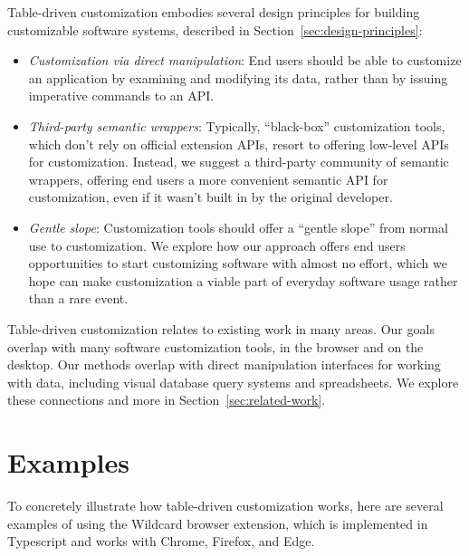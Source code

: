 \documentclass[sigplan,10pt,anonymous,review]{acmart}
\providecommand{\tightlist}{%
  \setlength{\itemsep}{0pt}\setlength{\parskip}{0pt}}
\begin{document}
Table-driven customization embodies several design principles for
building customizable software systems, described in
Section~\ref{sec:design-principles}:

\begin{itemize}
\tightlist
\item
  \emph{Customization via direct manipulation}: End users should be able
  to customize an application by examining and modifying its data,
  rather than by issuing imperative commands to an API.
\item
  \emph{Third-party semantic wrappers}: Typically, ``black-box''
  customization tools, which don't rely on official extension APIs,
  resort to offering low-level APIs for customization. Instead, we
  suggest a third-party community of semantic wrappers, offering end
  users a more convenient semantic API for customization, even if it
  wasn't built in by the original developer.
\item
  \emph{Gentle slope}: Customization tools should offer a ``gentle
  slope'' from normal use to customization. We explore how our approach
  offers end users opportunities to start customizing software with
  almost no effort, which we hope can make customization a viable part
  of everyday software usage rather than a rare event.
\end{itemize}

Table-driven customization relates to existing work in many areas. Our
goals overlap with many software customization tools, in the browser and
on the desktop. Our methods overlap with direct manipulation interfaces
for working with data, including visual database query systems and
spreadsheets. We explore these connections and more in
Section~\ref{sec:related-work}.

\hypertarget{sec:examples}{%
\section{Examples}\label{sec:examples}}

To concretely illustrate how table-driven customization works, here are
several examples of using the Wildcard browser extension, which is
implemented in Typescript and works with Chrome, Firefox, and Edge.
\end{document}
